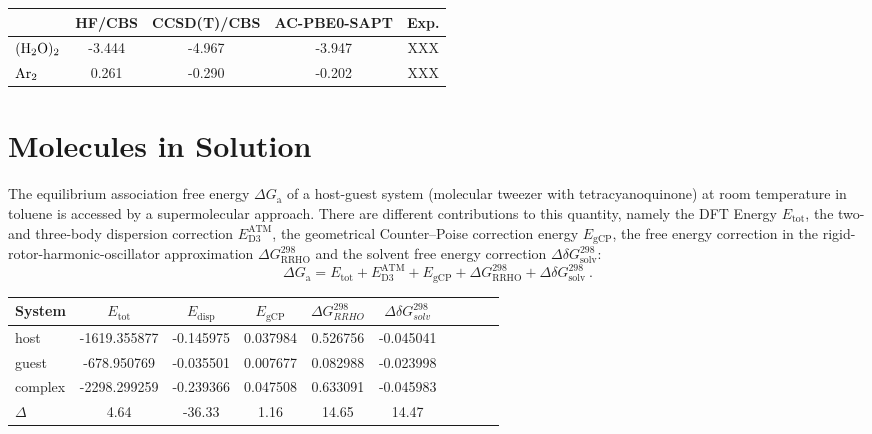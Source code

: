 \documentclass[a4paper,12pt]{scrartcl}
\newcommand{\m}[1]{\mathrm{#1}}
\begin{document}
%
\begin{table}[H]
	\centering
	\label{tab:extrapolated}
	\begin{tabular}{l|cccc}
		\toprule
		                & HF/CBS & CCSD(T)/CBS & AC-PBE0-SAPT & Exp. \\
		\midrule
		$ \ce{(H2O)2} $ & -3.444 & -4.967      & -3.947       & XXX  \\
		$ \ce{Ar2} $    & 0.261  & -0.290      & -0.202       & XXX  \\
		\bottomrule
	\end{tabular}
\end{table}
%
\section{Molecules in Solution}
%
The equilibrium association free energy $ \Delta G_\mathrm{a} $ of a host-guest system (molecular tweezer with tetracyanoquinone) at room temperature in toluene is accessed by a supermolecular approach. There are different contributions to this quantity, namely the DFT Energy $ E_\mathrm{tot} $, the two- and three-body dispersion correction $ E_\mathrm{D3}^\mathrm{ATM} $, the geometrical Counter--Poise correction energy $ E_\mathrm{gCP} $, the free energy correction in the rigid-rotor-harmonic-oscillator approximation $ \Delta G_\mathrm{RRHO}^{298} $ and the solvent free energy correction $ \Delta \delta G_\mathrm{solv}^{298} $:
%
\begin{equation}
	\Delta G_\mathrm{a} =  E_\mathrm{tot} + E_\mathrm{D3}^\mathrm{ATM} + E_\mathrm{gCP} + \Delta G_\mathrm{RRHO}^{298} +  \Delta \delta G_\mathrm{solv}^{298}~.
\end{equation}
%
\begin{table}[H]
	\centering
	\label{tab:complex}
	\begin{tabular}{l|ccccccccc}
		\toprule
		System   & $ E_\m{tot} $ & $ E_\m{disp} $ & $ E_\m{gCP} $ & $ \Delta G_{RRHO}^{298} $ & $ \Delta \delta G_{solv}^{298}$ \\
		\midrule
		host     & -1619.355877  & -0.145975      & 0.037984      & 0.526756                  & -0.045041                       \\
		guest    & -678.950769   & -0.035501      & 0.007677      & 0.082988                  & -0.023998                       \\
		complex  & -2298.299259  & -0.239366      & 0.047508      & 0.633091                  & -0.045983                       \\
		\midrule
		$\Delta$ & 4.64          & -36.33         & 1.16          & 14.65                     & 14.47                           \\
		\bottomrule
	\end{tabular}
\end{table}
\end{document}
